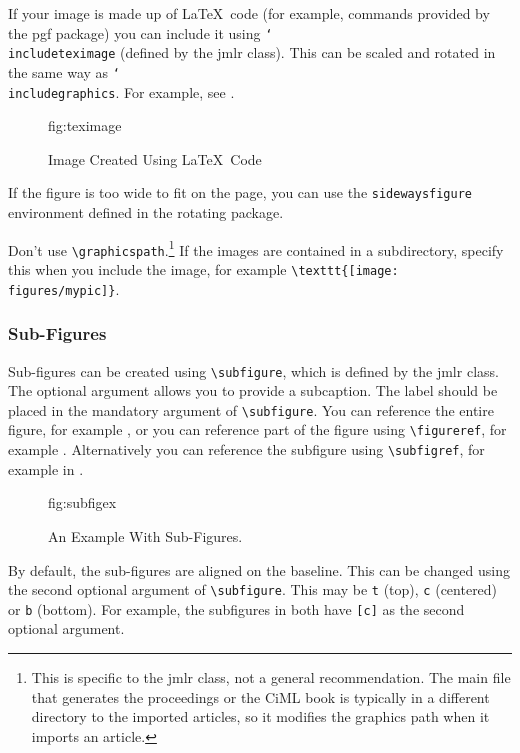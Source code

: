 \documentclass[pmlr,twocolumn,10pt]{jmlr} %
\newcommand{\cs}[1]{\texttt{\char`\\#1}}%
\begin{document}
If your image is made up of \LaTeX\ code (for example, commands
provided by the \textsf{pgf} package) you can include it using
\cs{includeteximage} (defined by the \textsf{jmlr} class). This
can be scaled and rotated in the same way as \cs{includegraphics}.
For example, see .

\begin{figure}[htbp]
\floatconts
  {fig:teximage}
  {\caption{Image Created Using \LaTeX\ Code}}
  {}
\end{figure}

If the figure is too wide to fit on the page, you can use the
\texttt{sidewaysfigure} environment defined in the
\textsf{rotating} package.

Don't use \verb|\graphicspath|.\footnote{This is specific to the
\textsf{jmlr} class, not a general recommendation. The main file
that generates the proceedings or the CiML book is typically in a
different directory to the imported articles, so it modifies the
graphics path when it imports an article.} If the images 
are contained in a subdirectory, specify this when you include the image, for
example \verb|\texttt{[image: figures/mypic]}|.

\subsubsection{Sub-Figures}
\label{sec:subfigures}

Sub-figures can be created using \verb|\subfigure|, which is
defined by the \textsf{jmlr} class. The optional argument allows
you to provide a subcaption. The label should be placed in the
mandatory argument of \verb|\subfigure|. You can reference the
entire figure, for example , or you can
reference part of the figure using \verb|\figureref|, for example
. Alternatively you can reference the
subfigure using \verb|\subfigref|, for example
 in .

\begin{figure}[htbp]
\floatconts
  {fig:subfigex}
  {\caption{An Example With Sub-Figures.}}
  {%
    \qquad
  }
\end{figure}

By default, the sub-figures are aligned on the baseline.
This can be changed using the second optional argument
of \verb|\subfigure|. This may be \texttt{t} (top), \texttt{c}
(centered) or \texttt{b} (bottom). For example, the subfigures
 in 
both have \verb|[c]| as the second optional argument.
\end{document}
